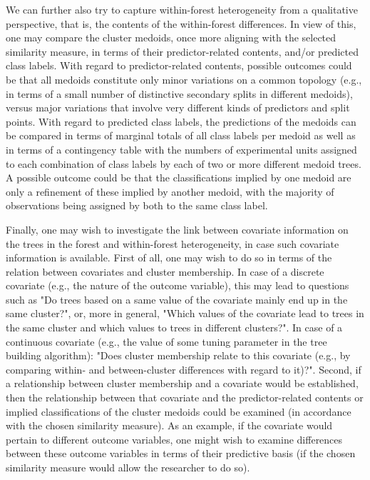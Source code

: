 We can further also try to capture within-forest heterogeneity from a qualitative perspective, that is, the contents of the within-forest differences. In view of this, one may compare the cluster medoids, once more aligning with the selected similarity measure, in terms of their predictor-related contents, and/or predicted class labels. With regard to predictor-related contents, possible outcomes could be that all medoids constitute only minor variations on a common topology (e.g., in terms of a small number of distinctive secondary splits in different medoids), versus major variations that involve very different kinds of predictors and split points. With regard to predicted class labels, the predictions of the medoids can be compared in terms of  marginal totals of all class labels per medoid as well as in terms of a contingency table with the numbers of experimental units assigned to each combination of class labels by each of two or more different medoid trees. A possible outcome could be that the classifications implied by one medoid are only a refinement of these implied by another medoid, with the majority of observations being assigned by both to the same class label.

Finally, one may wish to investigate the link between covariate information on the trees in the forest and within-forest heterogeneity, in case such covariate information is available. First of all, one may wish to do so in terms of the relation between covariates and cluster membership. In case of a discrete covariate (e.g., the nature of the outcome variable), this may lead to questions such as "Do trees based on a same value of the covariate mainly end up in the same cluster?", or, more in general, "Which values of the covariate lead to trees in the same cluster and which values to trees in different clusters?". In case of a continuous covariate (e.g., the value of some tuning parameter in the tree building algorithm): "Does cluster membership relate to this covariate (e.g., by comparing within- and between-cluster differences with regard to it)?". Second, if a relationship between cluster membership and a covariate would be established, then the relationship between that covariate and the predictor-related contents or implied classifications of the cluster medoids could be examined (in accordance with the chosen similarity measure). As an example, if the covariate would pertain to different outcome variables, one might wish to examine differences between these outcome variables in terms of their predictive basis (if the chosen similarity measure would allow the researcher to do so).


